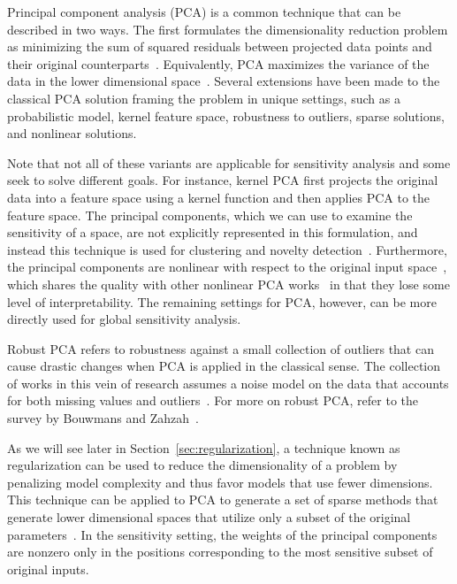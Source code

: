 Principal component analysis (PCA) is a common technique that can be described in two ways.
%
The first formulates the dimensionality reduction problem as minimizing the sum of squared residuals between projected data points and their original counterparts~\cite{Pearson1901}.
%
Equivalently, PCA maximizes the variance of the data in the lower dimensional space~\cite{Hotelling1933}.
%
Several extensions have been made to the classical PCA solution framing the problem in unique settings, such as a probabilistic model, kernel feature space, robustness to outliers, sparse solutions, and nonlinear solutions.

Note that not all of these variants are applicable for sensitivity analysis and some seek to solve different goals.
%
For instance, kernel PCA first projects the original data into a feature space using a kernel function and then applies PCA to the feature space.
%
The principal components, which we can use to examine the sensitivity of a space, are not explicitly represented in this formulation, and instead this technique is used for clustering and novelty detection~\cite{ScholkopfSmolaMuller1997}.
%
Furthermore, the principal components are nonlinear with respect to the original input space~\cite{BishopNasrabadi2006}, which shares the quality with other nonlinear PCA works~\cite{CollinsDasguptaSchapire2001,MohamedGhahramaniHeller2009,HyvarinenKarhunenOja2001} in that they lose some level of interpretability.
%
The remaining settings for PCA, however, can be more directly used for global sensitivity analysis.

Robust PCA refers to robustness against a small collection of outliers that can cause drastic changes when PCA is applied in the classical sense.
%
The collection of works in this vein of research assumes a noise model on the data that accounts for both missing values and outliers~\cite{CandesLiMa2011,Choulakian2006,GalpinHawkins1987}.
%
For more on robust PCA, refer to the survey by Bouwmans and Zahzah~\cite{BouwmansZahzah2014}.

As we will see later in Section~\ref{sec:regularization}, a technique known as regularization can be used to reduce the dimensionality of a problem by penalizing model complexity and thus favor models that use fewer dimensions.
%
This technique can be applied to PCA to generate a set of sparse methods that generate lower dimensional spaces that utilize only a subset of the original parameters~\cite{dAspremontBachGhaoui2008,dAspremontGhaouiJordan2007,JourneeNesterovRichtarik2010,ZouHastieTibshirani2006}.
%
In the sensitivity setting, the weights of the principal components are nonzero only in the positions corresponding to the most sensitive subset of original inputs.

